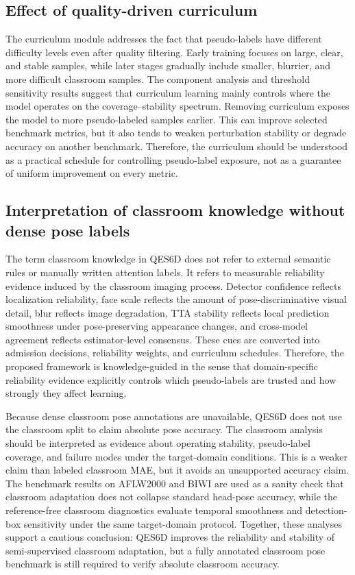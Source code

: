 \documentclass[preprint,12pt]{elsarticle}
\begin{document}
\subsection{Effect of quality-driven curriculum}
The curriculum module addresses the fact that pseudo-labels have different difficulty levels even after quality filtering. Early training focuses on large, clear, and stable samples, while later stages gradually include smaller, blurrier, and more difficult classroom samples. The component analysis and threshold sensitivity results suggest that curriculum learning mainly controls where the model operates on the coverage--stability spectrum. Removing curriculum exposes the model to more pseudo-labeled samples earlier. This can improve selected benchmark metrics, but it also tends to weaken perturbation stability or degrade accuracy on another benchmark. Therefore, the curriculum should be understood as a practical schedule for controlling pseudo-label exposure, not as a guarantee of uniform improvement on every metric.

\subsection{Interpretation of classroom knowledge without dense pose labels}
The term classroom knowledge in QES6D does not refer to external semantic rules or manually written attention labels. It refers to measurable reliability evidence induced by the classroom imaging process. Detector confidence reflects localization reliability, face scale reflects the amount of pose-discriminative visual detail, blur reflects image degradation, TTA stability reflects local prediction smoothness under pose-preserving appearance changes, and cross-model agreement reflects estimator-level consensus. These cues are converted into admission decisions, reliability weights, and curriculum schedules. Therefore, the proposed framework is knowledge-guided in the sense that domain-specific reliability evidence explicitly controls which pseudo-labels are trusted and how strongly they affect learning.

Because dense classroom pose annotations are unavailable, QES6D does not use the classroom split to claim absolute pose accuracy. The classroom analysis should be interpreted as evidence about operating stability, pseudo-label coverage, and failure modes under the target-domain conditions. This is a weaker claim than labeled classroom MAE, but it avoids an unsupported accuracy claim. The benchmark results on AFLW2000 and BIWI are used as a sanity check that classroom adaptation does not collapse standard head-pose accuracy, while the reference-free classroom diagnostics evaluate temporal smoothness and detection-box sensitivity under the same target-domain protocol. Together, these analyses support a cautious conclusion: QES6D improves the reliability and stability of semi-supervised classroom adaptation, but a fully annotated classroom pose benchmark is still required to verify absolute classroom accuracy.
\end{document}
